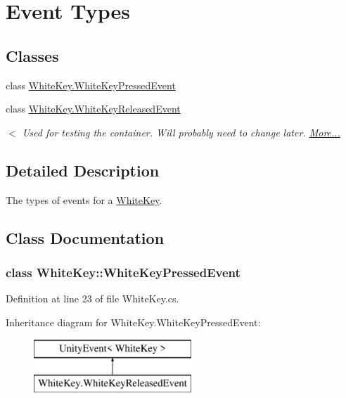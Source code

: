 \hypertarget{group___white_key_event_types}{}\section{Event Types}
\label{group___white_key_event_types}
\subsection*{Classes}
\begin{DoxyCompactItemize}
\item 
class \hyperlink{group___white_key_event_types_class_white_key_1_1_white_key_pressed_event}{White\+Key.\+White\+Key\+Pressed\+Event}
\item 
class \hyperlink{group___white_key_event_types_class_white_key_1_1_white_key_released_event}{White\+Key.\+White\+Key\+Released\+Event}
\begin{DoxyCompactList}\small\item\em $<$ Used for testing the container. Will probably need to change later.  \hyperlink{group___white_key_event_types_class_white_key_1_1_white_key_released_event}{More...}\end{DoxyCompactList}\end{DoxyCompactItemize}


\subsection{Detailed Description}
The types of events for a \hyperlink{class_white_key}{White\+Key}. 

\subsection{Class Documentation}
\label{class_white_key_1_1_white_key_pressed_event}
\subsubsection{class White\+Key\+:\+:White\+Key\+Pressed\+Event}


Definition at line 23 of file White\+Key.\+cs.

Inheritance diagram for White\+Key.\+White\+Key\+Pressed\+Event\+:\begin{figure}[H]
\begin{center}
\leavevmode
\includegraphics[height=2.000000cm]{group___white_key_event_types}
\end{center}
\end{figure}
\label{class_white_key_1_1_white_key_released_event}
